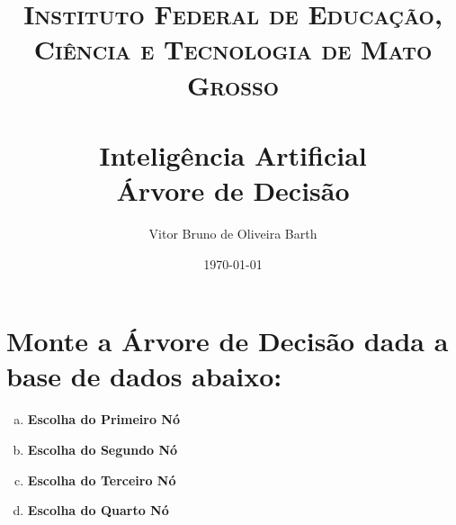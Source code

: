 \documentclass[paper=a4, fontsize=11pt]{scrartcl} %
\title{	
    \normalfont \normalsize 
    \textsc{Instituto Federal de Educação, Ciência e Tecnologia de Mato Grosso} \\ [25pt] %
    \horrule{0.5pt} \\[0.4cm] %
    \huge Inteligência Artificial \\ %
    \huge Árvore de Decisão
    \horrule{2pt} \\[0.5cm] %
    }
\author{Vitor Bruno de Oliveira Barth} %
\date{\normalsize\today} %
\begin{document}
    
    \maketitle
    
    
	\section{Monte a Árvore de Decisão dada a base de dados abaixo:}

	

	\begin{enumerate}[(a)]
        \item \textbf{Escolha do Primeiro Nó}
		\par 
		\vskip 0.3in
		\item \textbf{Escolha do Segundo Nó}
		\par 
		\vskip 0.3in
		\item \textbf{Escolha do Terceiro Nó}
		\par 
		\vskip 0.3in
		\item \textbf{Escolha do Quarto Nó}
        \par 
    \end{enumerate}




    
\end{document}
